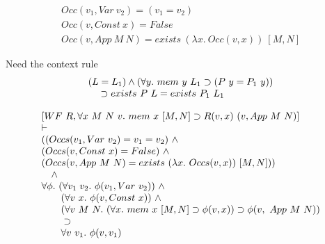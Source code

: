 \begin{slide}
\[\begin{array}{l}
    Occ (v_1, Var\ v_2) = (v_1 = v_2) \\
    Occ (v, Const\ x) = False \\
    Occ (v, App\ M\ N) = exists\ (\lambda x.\ Occ(v,x))\ [M, N]
\end{array}\]

\noindent Need the context rule
\[\begin{array}{l}
   (L = L_1) \land (\forall y.\ mem\ y\ L_1 \supset (P\ y = P_1\ y)) \\ 
{~~~}   \supset exists\ P\ L = exists\ P_1\ L_1
\end{array}\]

\[\begin{array}{l}
 [WF\ R, \forall x\ M\ N\ v.\ mem\ x\ [M,N] \supset R (v,x)\ (v, App\ M\ N)] \\
\vdash \\
 ((Occs (v_1,Var\ v_2) = v_1 = v_2)\ \land \\
  (Occs (v,Const\ x) = False)\ \land \\
  (Occs (v,App\ M\ N) = exists\ (\lambda x.\ Occs (v,x))\ [M, N])) \\
{~~~}  \land \\
 \forall \phi.\ (\forall v_1\; v_2.\ \phi (v_1,Var\ v_2))\ \land  \\
{~~~~~~}       (\forall v\ x.\ \phi (v,Const\ x))\ \land \\
{~~~~~~}       (\forall v\ M\ N.\ (\forall x.\ mem\ x\ [M, N] \supset \phi (v,x))
 \supset \phi (v,\ App\ M\ N)) \\
{~~~~~~}       \supset \\
{~~~~~~}\forall v\ v_1.\ \phi (v,v_1)
\end{array}\]

\end{slide}


